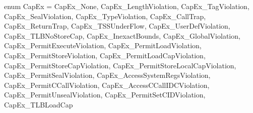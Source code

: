 enum CapEx = {
  CapEx_None,
  CapEx_LengthViolation,
  CapEx_TagViolation,
  CapEx_SealViolation,
  CapEx_TypeViolation,
  CapEx_CallTrap,
  CapEx_ReturnTrap,
  CapEx_TSSUnderFlow,
  CapEx_UserDefViolation,
  CapEx_TLBNoStoreCap,
  CapEx_InexactBounds,
  CapEx_GlobalViolation,
  CapEx_PermitExecuteViolation,
  CapEx_PermitLoadViolation,
  CapEx_PermitStoreViolation,
  CapEx_PermitLoadCapViolation,
  CapEx_PermitStoreCapViolation,
  CapEx_PermitStoreLocalCapViolation,
  CapEx_PermitSealViolation,
  CapEx_AccessSystemRegsViolation,
  CapEx_PermitCCallViolation,
  CapEx_AccessCCallIDCViolation,
  CapEx_PermitUnsealViolation,
  CapEx_PermitSetCIDViolation,
  CapEx_TLBLoadCap
}
